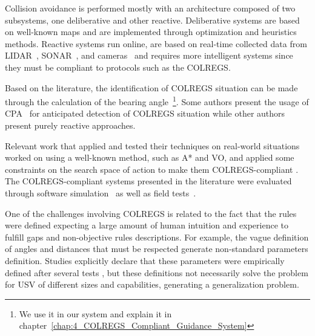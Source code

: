     Collision avoidance is performed mostly with an architecture composed of two subsystems, one deliberative and other reactive. Deliberative systems are based on well-known maps and are implemented through optimization and heuristics methods. Reactive systems run online, are based on real-time collected data from \ac{LIDAR}~\cite{Agrawal2015COLREGS}, \ac{SONAR}~\cite{Candeloro2017Voronoi}, and cameras~\cite{Kuwata2014Safe} and requires more intelligent systems since they must be compliant to protocols such as the \ac{COLREGS}. 
    
    Based on the literature, the identification of \ac{COLREGS} situation can be made through the calculation of the bearing angle~\cite{Kuwata2014Safe}\footnote{We use it in our system and explain it in chapter~\ref{chap:4_COLREGS_Compliant_Guidance_System}}. Some authors present the usage of \ac{CPA}~\cite{Campbell2013Automatic} for anticipated detection of \ac{COLREGS} situation while other authors present purely reactive approaches.
    
    Relevant work that applied and tested their techniques on real-world situations worked on using a well-known method, such as A* and \ac{VO}, and applied some constraints on the search space of action to make them \ac{COLREGS}-compliant \cite{Kuwata2014Safe, Campbell2013Automatic}. 
    The \ac{COLREGS}-compliant systems presented in the literature were evaluated through software simulation~\cite{Soltan2009Trajectory, Abdelaal2017NMPC, Benjamin2004COLREGS, Lee2004Fuzzy} as well as field tests~\cite{Agrawal2015COLREGS, Benjamin2004COLREGS, Kuwata2014Safe}.
    
    One of the challenges involving \ac{COLREGS} is related to the fact that the rules were defined expecting a large amount of human intuition and experience to fulfill gaps and non-objective rules descriptions. For example, the vague definition of angles and distances that must be respected generate non-standard parameters definition. Studies explicitly declare that these parameters were empirically defined after several tests \cite{Larson2007Advances}, but these definitions not necessarily solve the problem for \ac{USV} of different sizes and capabilities, generating a generalization problem.
    

    
    
    
